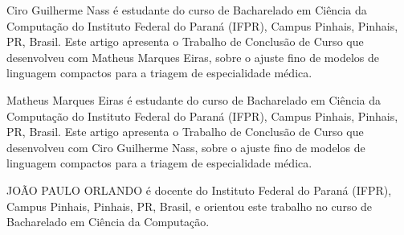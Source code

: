 \documentclass{ieeeaccess}
\begin{document}
\begin{IEEEbiographynophoto}{Ciro Guilherme Nass} \'e estudante do curso de Bacharelado em Ci\^encia da Computa\c{c}\~ao do Instituto Federal do Paran\'a (IFPR), Campus Pinhais, Pinhais, PR, Brasil. Este artigo apresenta o Trabalho de Conclus\~ao de Curso que desenvolveu com Matheus Marques Eiras, sobre o ajuste fino de modelos de linguagem compactos para a triagem de especialidade m\'edica.
\end{IEEEbiographynophoto}

\begin{IEEEbiographynophoto}{Matheus Marques Eiras} \'e estudante do curso de Bacharelado em Ci\^encia da Computa\c{c}\~ao do Instituto Federal do Paran\'a (IFPR), Campus Pinhais, Pinhais, PR, Brasil. Este artigo apresenta o Trabalho de Conclus\~ao de Curso que desenvolveu com Ciro Guilherme Nass, sobre o ajuste fino de modelos de linguagem compactos para a triagem de especialidade m\'edica.
\end{IEEEbiographynophoto}

\begin{IEEEbiographynophoto}{JO\~AO PAULO ORLANDO} \'e docente do Instituto Federal do Paran\'a (IFPR), Campus Pinhais, Pinhais, PR, Brasil, e orientou este trabalho no curso de Bacharelado em Ci\^encia da Computa\c{c}\~ao.
\end{IEEEbiographynophoto}

\EOD
\end{document}
